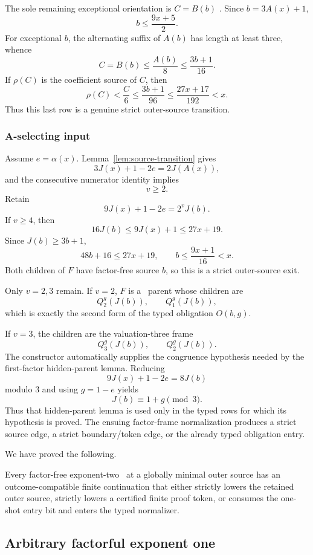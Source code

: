 The sole remaining exceptional orientation is $C=B(b)$ \DRAW. Since
$b=3A(x)+1$,
\[
 b\le\frac{9x+5}{2}.
\]
For exceptional $b$, the alternating suffix of $A(b)$ has length at least
three, whence
\[
 C=B(b)\le\frac{A(b)}8\le\frac{3b+1}{16}.
\]
If $\rho(C)$ is the coefficient source of $C$, then
\[
 \rho(C)<\frac C6
 \le\frac{3b+1}{96}
 \le\frac{27x+17}{192}<x.
\]
Thus this last row is a genuine strict outer-source transition.

\subsubsection{A-selecting input}

Assume $e=\alpha(x)$. Lemma~\ref{lem:source-transition} gives
\[
 3J(x)+1-2e=2J(A(x)),
\]
and the consecutive numerator identity implies
\[
 \boxed{v\ge2.}
\]
Retain
\[
 9J(x)+1-2e=2^vJ(b).
\]
If $v\ge4$, then
\[
 16J(b)\le9J(x)+1\le27x+19.
\]
Since $J(b)\ge3b+1$,
\[
 48b+16\le27x+19,
 \qquad
 \boxed{b\le\frac{9x+1}{16}<x.}
\]
Both children of $F$ have factor-free source $b$, so this is a strict
outer-source exit.

Only $v=2,3$ remain. If $v=2$, $F$ is a \DRAW\ parent whose children are
\[
 Q_2^g(J(b)),\qquad Q_1^g(J(b)),
\]
which is exactly the second form of the typed obligation $O(b,g)$.

If $v=3$, the children are the valuation-three frame
\[
 Q_3^g(J(b)),\qquad Q_2^g(J(b)).
\]
The constructor automatically supplies the congruence hypothesis needed by
the first-factor hidden-parent lemma. Reducing
\[
 9J(x)+1-2e=8J(b)
\]
modulo $3$ and using $g=1-e$ yields
\[
 \boxed{J(b)\equiv1+g\pmod3.}
\]
Thus that hidden-parent lemma is used only in the typed rows for which its
hypothesis is proved. The ensuing factor-frame normalization produces a
strict source edge, a strict boundary/token edge, or the already typed
obligation entry.

We have proved the following.

\begin{proposition}\label{prop:baseattach}
Every factor-free exponent-two \DRAW\ at a globally minimal outer source has
an outcome-compatible finite continuation that either strictly lowers the
retained outer source, strictly lowers a certified finite proof token, or
consumes the one-shot entry bit and enters the typed normalizer.
\end{proposition}

\subsection{Arbitrary factorful exponent one}

